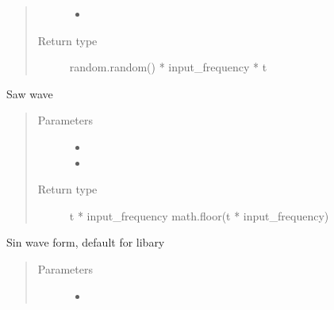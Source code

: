 \documentclass[letterpaper,10pt,english]{sphinxmanual}
\begin{document}
\begin{fulllineitems}
\begin{fulllineitems}
\begin{quote}
\begin{description}
\begin{itemize}
\item {} 
\sphinxAtStartPar
{} \textendash{} 

\end{itemize}

\item[{Return type}] \leavevmode
\sphinxAtStartPar
random.random() * input\_frequency * t

\end{description}\end{quote}

\end{fulllineitems}


\begin{fulllineitems}
\label{\detokenize{dpav:dpav.audio.wave_table.saw}}
\pysigstartsignatures
{}
\pysigstopsignatures
\sphinxAtStartPar
Saw wave
\begin{quote}\begin{description}
\item[{Parameters}] \leavevmode\begin{itemize}
\item {} 
\sphinxAtStartPar
{} \textendash{} 

\item {} 
\sphinxAtStartPar
{} \textendash{} 

\end{itemize}

\item[{Return type}] \leavevmode
\sphinxAtStartPar
t * input\_frequency \sphinxhyphen{} math.floor(t * input\_frequency)

\end{description}\end{quote}

\end{fulllineitems}


\begin{fulllineitems}
\label{\detokenize{dpav:dpav.audio.wave_table.sin}}
\pysigstartsignatures
{}
\pysigstopsignatures
\sphinxAtStartPar
Sin wave form, default for libary
\begin{quote}\begin{description}
\item[{Parameters}] \leavevmode\begin{itemize}
\item {} 
\sphinxAtStartPar
{} \textendash{} 


\end{itemize}
\end{description}
\end{quote}
\end{fulllineitems}
\end{fulllineitems}
\end{document}
